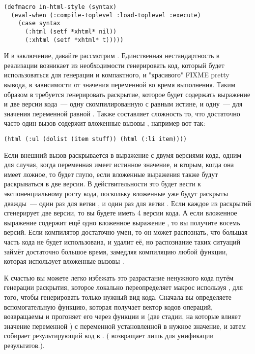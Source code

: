 \begin{lstlisting}
(defmacro in-html-style (syntax)
  (eval-when (:compile-toplevel :load-toplevel :execute)
    (case syntax
      (:html (setf *xhtml* nil))
      (:xhtml (setf *xhtml* t)))))
\end{lstlisting}

И в заключение, давайте рассмотрим .  Единственная нестандартность в реализации
 возникает из необходимости генерировать код, который будет использоваться для
генерации и компактного, и "красивого" FIXME pretty вывода, в зависимости от значения
переменной  во время выполнения.  Таким образом в  требуется
генерировать раскрытие, которое будет содержать выражение и две версии кода~---
одну скомпилированную с  равным истине, и одну~--- для значения переменной
равной .  Также составляет сложность то, что достаточно часто один вызов
 содержит вложенные вызовы , например вот так:

\begin{lstlisting}
(html (:ul (dolist (item stuff)) (html (:li item))))
\end{lstlisting}

Если внешний вызов  раскрывается в выражение  с двумя версиями кода,
одним для случая, когда переменная  имеет истинное значение, и вторым,
когда она имеет ложное, то будет глупо, если вложенные выражения  также будут
раскрываться в две версии.  В действительности это будет вести к экспоненциальному росту
кода, поскольку вложенные  уже будут раскрыты дважды~--- один раз для ветви
, и один раз для ветви .  Если каждое из
раскрытий сгенерирует две версии, то вы будете иметь 4 версии кода.  А если вложенное
выражение  содержит ещё одно вложенное выражение , то вы получите
восемь версий.  Если компилятор достаточно умен, то он может распознать, что большая часть
кода не будет использована, и удалит её, но распознание таких ситуаций займёт достаточно
большое время, замедляя компиляцию любой функции, которая использует вложенные вызовы
.

К счастью вы можете легко избежать это разрастание ненужного кода путём генерации
раскрытия, которое локально переопределяет макрос  используя ,
для того, чтобы генерировать только нужный вид кода.  Сначала вы определяете
вспомогательную функцию, которая получает вектор кодов операций, возвращаемы
 и прогоняет его через функции  и
 (две стадии, на которые влияет значение переменной ) с
переменной  установленной в нужное значение, и затем собирает
результирующий код в . ( возвращает  лишь для унификации
результатов.).

